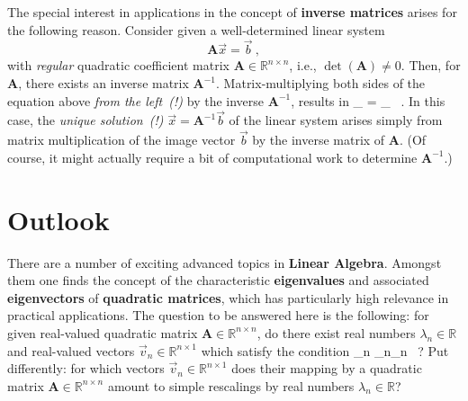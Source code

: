 \medskip
\noindent
The special interest in applications in the concept of {\bf 
inverse matrices} arises for the following reason. Consider given 
a well-determined linear system
\[
\mathbf{A}\vec{x}=\vec{b} \ ,
\]
with \emph{regular} quadratic coefficient matrix $\mathbf{A} 
\in \mathbb{R}^{n \times n}$, i.e., $\det(\mathbf{A}) \neq 0$. 
Then, for $\mathbf{A}$, there exists an inverse matrix 
$\mathbf{A}^{-1}$. Matrix-multiplying both sides of the equation 
above \emph{from the left~(!)} by the inverse $\mathbf{A}^{-1}$, 
results in
%
\be
{}_{}
= _{} \ .
\ee
%
In this case, the \emph{unique solution~(!)} $\vec{x} = 
\mathbf{A}^{-1}\vec{b}$ of the linear system arises simply from 
matrix multiplication of the image vector $\vec{b}$ by the inverse 
matrix of $\mathbf{A}$. (Of course, it might actually require a 
bit of computational work to determine $\mathbf{A}^{-1}$.)

\section[Outlook]{Outlook}
There are a number of exciting advanced topics in {\bf Linear 
Algebra}. Amongst them one finds the concept of the characteristic 
{\bf eigenvalues} and associated {\bf eigenvectors} of {\bf 
quadratic matrices}, which has particularly high relevance in 
practical applications. The question to be answered here is the 
following: for given real-valued quadratic matrix $\mathbf{A} \in 
\mathbb{R}^{n \times n}$, do there exist real numbers $\lambda_{n} 
\in \mathbb{R}$ and real-valued vectors $\vec{v}_{n} \in 
\mathbb{R}^{n \times 1}$ which satisfy the condition
%
\be
{}
_{n} \stackrel{!}{=} \lambda_{n}_{n} \ ?
\ee
%
Put differently: for which vectors $\vec{v}_{n} \in \mathbb{R}^{n 
\times 1}$ does their mapping by a quadratic matrix $\mathbf{A} 
\in \mathbb{R}^{n \times n}$ amount to simple rescalings by real 
numbers $\lambda_{n} \in \mathbb{R}$?

